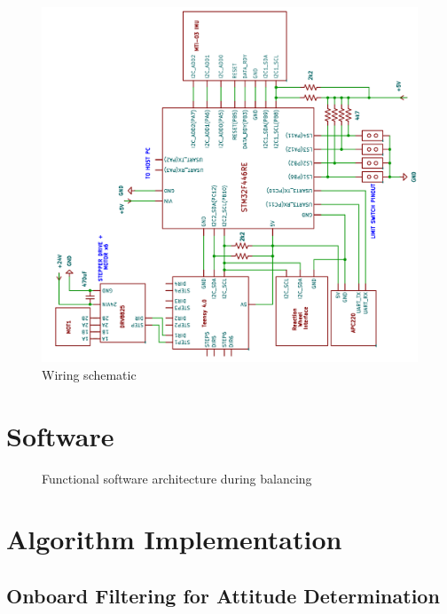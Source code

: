 \begin{figure}[h]\label{fig:wiring}
    \centering
    \includegraphics[width=0.95\linewidth,angle=-90]{figures/wiring.png}
    \caption{Wiring schematic}
\end{figure}




\section{Software}

\begin{figure}
    \centering
    
    \caption{Functional software architecture during balancing}
    \label{fig:software_flowchart}
\end{figure}




\section{Algorithm Implementation}

\subsection{Onboard Filtering for Attitude Determination}


